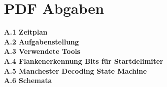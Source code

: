 
\chapter{PDF Abgaben}
\label{AppendixA}

\textbf{A.1 Zeitplan\\
A.2 Aufgabenstellung\\
A.3 Verwendete Tools\\
A.4 Flankenerkennung Bits für Startdelimiter\\
A.5 Manchester Decoding State Machine\\
A.6 Schemata}




\newpage








%

